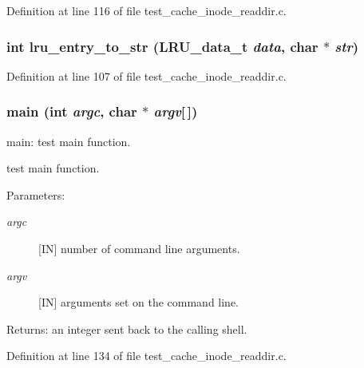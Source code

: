 Definition at line 116 of file test\_\-cache\_\-inode\_\-readdir.c.
\subsubsection[{lru\_\-entry\_\-to\_\-str}]{\setlength{\rightskip}{0pt plus 5cm}int lru\_\-entry\_\-to\_\-str (LRU\_\-data\_\-t {\em data}, \/  char $\ast$ {\em str})}\label{test__cache__inode__readdir_8c_d3e6e5506644e1986e6475939863ad3e}




Definition at line 107 of file test\_\-cache\_\-inode\_\-readdir.c.
\subsubsection[{main}]{\setlength{\rightskip}{0pt plus 5cm}main (int {\em argc}, \/  char $\ast$ {\em argv}[$\,$])}\label{test__cache__inode__readdir_8c_e0665038b72011f5c680c660fcb59459}


main: test main function.

test main function.

\begin{Desc}
\item[Parameters:]
\begin{description}
\item[{\em argc}][IN] number of command line arguments. \item[{\em argv}][IN] arguments set on the command line.\end{description}
\end{Desc}
\begin{Desc}
\item[Returns:]an integer sent back to the calling shell. \end{Desc}


Definition at line 134 of file test\_\-cache\_\-inode\_\-readdir.c.